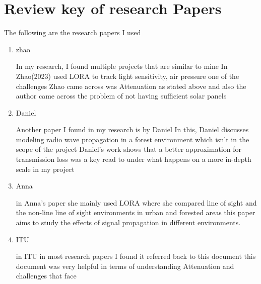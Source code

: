 \section{Review  key of research Papers}
The following are the research papers I used
\begin{enumerate}
	
	\item zhao
	
		In my research, I found  multiple projects that are similar to mine 
		In Zhao(2023)\cite[zhao]{zhao}  
		used  LORA to  track  light sensitivity, air pressure
		one of the challenges Zhao came across was Attenuation as stated above and also the author came across the problem of not having sufficient solar panels 
	\item Daniel
	
		Another paper I found in my research is by Daniel \cite{Daniel}
		In this, Daniel discusses modeling radio wave propagation in a forest environment which isn't in the scope of the project
		Daniel's work shows that a better approximation  for transmission loss was a key read to  under what happens on a more in-depth scale in my project
	
	\item Anna
	
		\cite{Anna} in Anna's paper  she  mainly used LORA where she compared line of sight and  the  non-line  line of sight environments in  urban and  forested areas
		this paper aims to study the effects of signal propagation in different environments.
	

	\item ITU
	
		\cite{ITU} in ITU in most research papers I found  it  referred back to this  document this document was  very helpful in terms  of  understanding Attenuation  and challenges that face

\end{enumerate}


